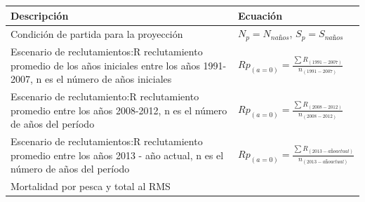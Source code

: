 \documentclass[
  spanish,
]{article}
\begin{document}
\begin{longtable}[]{@{}ll@{}}
\toprule
\begin{minipage}[b]{0.57\columnwidth}\raggedright
Descripción\strut
\end{minipage} & \begin{minipage}[b]{0.37\columnwidth}\raggedright
Ecuación\strut
\end{minipage}\tabularnewline
\midrule
\endhead
\begin{minipage}[t]{0.57\columnwidth}\raggedright
Condición de partida para la proyección\strut
\end{minipage} & \begin{minipage}[t]{0.37\columnwidth}\raggedright
\(N_p=N_{naños}\), \(S_p=S_{naños}\)\strut
\end{minipage}\tabularnewline
\begin{minipage}[t]{0.57\columnwidth}\raggedright
Escenario de reclutamientos:R reclutamiento promedio de los años
iniciales entre los años 1991-2007, n es el número de años
iniciales\strut
\end{minipage} & \begin{minipage}[t]{0.37\columnwidth}\raggedright
\(Rp_{(a=0)}=\frac{\sum{R_{(1991-2007)}}}{n_{(1991-2007)}}\)\strut
\end{minipage}\tabularnewline
\begin{minipage}[t]{0.57\columnwidth}\raggedright
Escenario de reclutamiento:R reclutamiento promedio entre los años
2008-2012, n es el número de años del período\strut
\end{minipage} & \begin{minipage}[t]{0.37\columnwidth}\raggedright
\(Rp_{(a=0)}=\frac{\sum{R_{(2008-2012)}}}{n_{(2008-2012)}}\)\strut
\end{minipage}\tabularnewline
\begin{minipage}[t]{0.57\columnwidth}\raggedright
Escenario de reclutamientos:R reclutamiento promedio entre los años 2013
- año actual, n es el número de años del período\strut
\end{minipage} & \begin{minipage}[t]{0.37\columnwidth}\raggedright
\(Rp_{(a=0)}=\frac{\sum{R_{(2013-añoactual)}}}{n_{(2013-año actual)}}\)\strut
\end{minipage}\tabularnewline
\begin{minipage}[t]{0.57\columnwidth}\raggedright
Mortalidad por pesca y total al RMS\strut
\end{minipage} & \begin{minipage}[t]{0.37\columnwidth}\raggedright

\end{minipage}
\end{longtable}
\end{document}
